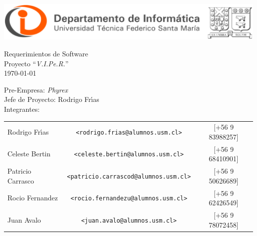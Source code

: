 \documentclass[letterpaper,12pt]{article} %
\numberwithin{equation}{section} %
\numberwithin{figure}{section} %
\numberwithin{table}{section} %
\begin{document}
\begin{titlepage} %
\thispagestyle{empty} %
\begin{center}
\includegraphics[scale=0.35]{logoUSM-DI.eps}
\end{center}

\vspace{3cm} %
\begin{center} %
{\Huge Requerimientos de Software \\
 \huge Proyecto ``\emph{V.I.Pe.R.}''\\
  \normalsize\today
}
\end{center}

\vspace{6cm}

\vfill
\begin{flushleft} %
Pre-Empresa: \emph{Phyrex}\\
Jefe de Proyecto: Rodrigo Fr\'{\i}as\\
Integrantes:
\begin{table}[hb]
  \begin{tabular}{lcc}
    Rodrigo Fr\'{\i}as & \texttt{\small <rodrigo.frias@alumnos.usm.cl>} & [+56 9 83988257] \\
    Celeste Bertin & \texttt{\small <celeste.bertin@alumnos.usm.cl>} &[+56 9 68410901]\\
    Patricio Carrasco &\texttt{\small <patricio.carrascod@alumnos.usm.cl>} &[+56 9 50626689]\\
    Rocio Fernandez &\texttt{\small <rocio.fernandezu@alumnos.usm.cl>} & [+56 9 62426549]\\
    Juan Avalo & \texttt{\small <juan.avalo@alumnos.usm.cl>} & [+56 9 78072458]\\
  \end{tabular}
\end{table}
\end{flushleft}
\end{titlepage}

\end{document}
